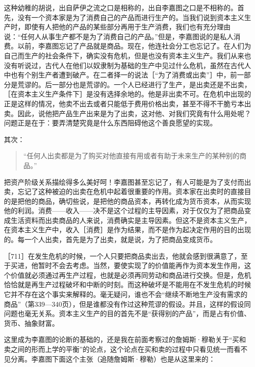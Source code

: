 这种幼稚的胡说，出自萨伊之流之口是相称的，出自李嘉图之口是不相称的。首先，没有一个资本家是为了消费自己的产品而进行生产的。当我们说到资本主义生产时，即使有人把他的产品的某些部分再用于生产消费，我们也有充分理由说：“任何人从事生产都不是为了消费自己的产品。”但是，李嘉图说的是私人消费。以前，李嘉图忘记了产品就是商品。现在，他连社会分工也忘记了。在人们为自己而生产的社会条件下，确实没有危机，但是也没有资本主义生产。我们从来也没有听说过，古代人在他们以奴隶制为基础的生产中见过什么危机，虽然在古代人中也有个别生产者遭到破产。在二者择一的说法［“为了消费或出卖”］中，前一部分是荒谬的。后一部分也是荒谬的。一个人已经进行了生产，是出卖还是不出卖，［在资本主义生产条件下］是没有选择余地的。他是非出卖不可。在危机中出现的正是这样的情况，他卖不出去或者只能低于费用价格出卖，甚至不得不干脆亏本出卖。因此，说他把产品生产出来是为了出卖，这对他、对我们究竟有什么用处呢？问题正是在于：要弄清楚究竟是什么东西阻碍他这个善良愿望的实现。

其次：

\begin{quote}{“任何人出卖都是为了购买对他直接有用或者有助于未来生产的某种别的商品。”}\end{quote}

把资产阶级关系描绘得多么美好呵！李嘉图甚至忘记了，有人可能是为了支付而出卖，忘记了这种被迫的出卖在危机中起着很重要的作用。资本家在出卖时的直接目的是把他的商品，确切些说，是把他的商品资本，再转化成为货币资本，从而实现他的利润。消费——收入——决不是这个过程的主导因素，对于仅仅为了把商品变成生活资料而出卖商品的人来说，消费确实是主导因素。但这不是资本主义生产，在资本主义生产中，收入［消费］是作为结果，而不是作为起决定作用的目的出现的。每一个人出卖，首先是为了出卖，就是说，为了把商品变成货币。

［711］在发生危机的时候，一个人只要把商品卖出去，他就会感到很满意了，至于买进，他暂时不会去考虑。当然，要使实现了的价值能再作为资本发生作用，这个价值就必须通过再生产过程，也就是必须再同劳动和商品进行交换。但是，危机恰恰就是再生产过程破坏和中断的时刻。而这种破坏是不能用在不发生危机的时候它并不存在这个事实来解释的。毫无疑问，谁也不会“继续不断地生产没有需求的商品”（第339—340页），但是谁都没有作过这种荒谬的假设。并且，这样的假设同问题也毫无关系。资本主义生产的目的首先不是“获得别的产品”，而是占有价值、货币、抽象财富。

这里成为李嘉图的论断的基础的，还是我在前面考察过的詹姆斯·穆勒关于“买和卖之间的形而上学的平衡”的论点，这个论点在买和卖的过程中只看见统一而看不见分离。李嘉图下面这个主张（追随詹姆斯·穆勒）也是从这里来的：

